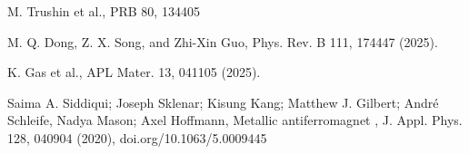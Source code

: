 \documentclass[prb,showpacs,amsmath,amssymb,superscriptaddress,twocolumn,floatfix]{revtex4-1}
\begin{document}
\begin{thebibliography}{99}





 M. Trushin et al., PRB 80, 134405

 M. Q. Dong, Z. X. Song, and Zhi-Xin Guo,
   Phys. Rev. B 111, 174447 (2025).

 K. Gas et al., APL Mater. 13, 041105 (2025).
  
 Saima A. Siddiqui; Joseph Sklenar; Kisung Kang; Matthew J. Gilbert; André Schleife, Nadya Mason; Axel Hoffmann,  Metallic antiferromagnet , J. Appl. Phys. 128, 040904 (2020), doi.org/10.1063/5.0009445
  
\end{thebibliography}
\end{document}
